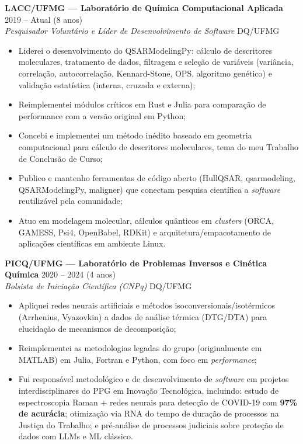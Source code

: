 \documentclass[10pt,a4paper]{article}
\newcommand{\entry}[4]{%
  \textbf{\sffamily\large #1} \hfill #2 \\
  {\itshape #3} \hfill {\small #4} \\[-0.75em]
}
\begin{document}
\entry{LACC/UFMG --- Laboratório de Química Computacional Aplicada}{2019 -- Atual (8 anos)}{Pesquisador Voluntário e Líder de Desenvolvimento de Software}{DQ/UFMG}
\begin{itemize}\footnotesize
  \item Liderei o desenvolvimento do QSARModelingPy: cálculo de descritores moleculares, tratamento de dados, filtragem e seleção de variáveis (variância, correlação, autocorrelação, Kennard-Stone, OPS, algoritmo genético) e validação estatística (interna, cruzada e externa);
  \item Reimplementei módulos críticos em Rust e Julia para comparação de performance com a versão original em Python;
  \item Concebi e implementei um método inédito baseado em geometria computacional para cálculo de descritores moleculares, tema do meu Trabalho de Conclusão de Curso;
  \item Publico e mantenho ferramentas de código aberto (HullQSAR, qsarmodeling, QSARModelingPy, maligner) que conectam pesquisa científica a \textit{software} reutilizável pela comunidade;
  \item Atuo em modelagem molecular, cálculos quânticos em \textit{clusters} (ORCA, GAMESS, Psi4, OpenBabel, RDKit) e arquitetura/empacotamento de aplicações científicas em ambiente Linux.
\end{itemize}

\vspace{0.7em}

\entry{PICQ/UFMG --- Laboratório de Problemas Inversos e Cinética Química}{2020 -- 2024 (4 anos)}{Bolsista de Iniciação Científica (CNPq)}{DQ/UFMG}
\begin{itemize}\footnotesize
  \item Apliquei redes neurais artificiais e métodos isoconversionais/isotérmicos (Arrhenius, Vyazovkin) a dados de análise térmica (DTG/DTA) para elucidação de mecanismos de decomposição;
  \item Reimplementei as metodologias legadas do grupo (originalmente em MATLAB) em Julia, Fortran e Python, com foco em \textit{performance};
  \item Fui responsável metodológico e de desenvolvimento de \textit{software} em projetos interdisciplinares do PPG em Inovação Tecnológica, incluindo: estudo de espectroscopia Raman + redes neurais para detecção de COVID-19 com \textbf{97\% de acurácia}; otimização via RNA do tempo de duração de processos na Justiça do Trabalho; e pré-análise de processos judiciais sobre proteção de dados com LLMs e ML clássico.
\end{itemize}
\end{document}
